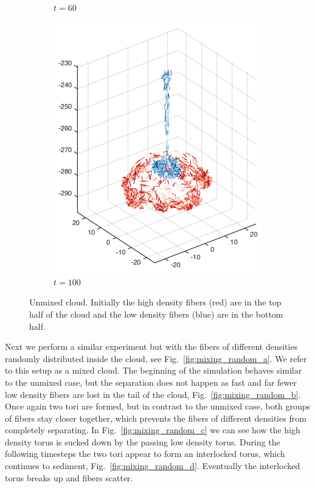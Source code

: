 \begin{figure}[!htbp]
\begin{subfigure}[h]{0.24\textwidth}
    \caption{$t=60$}\label{fig:mixing_top_c}
  \end{subfigure}
  \begin{subfigure}[h]{0.24\textwidth}
    \centering
    \includegraphics[width=\textwidth]{img/mixing/top_00100.pdf}
    \caption{$t=100$}\label{fig:mixing_top_d}
  \end{subfigure}
  \caption[Unmixed cloud.]{Unmixed cloud. Initially the high density fibers (red) are in the top half of the cloud and the low density fibers (blue) are in the bottom half.}
  \label{fig:unmixed_sphere}
\end{figure}

Next we perform a similar experiment but with the fibers of different densities randomly distributed inside the cloud, see Fig.~\ref{fig:mixing_random_a}. We refer to this setup as a mixed cloud. The beginning of the simulation behaves similar to the unmixed case, but the separation does not happen as fast and far fewer low density fibers are lost in the tail of the cloud, Fig.~\ref{fig:mixing_random_b}. Once again two tori are formed, but in contrast to the unmixed case, both groups of fibers stay closer together, which prevents the fibers of different densities from completely separating. In Fig.~\ref{fig:mixing_random_c} we can see how the high density torus is sucked down by the passing low density torus. During the following timesteps the two tori appear to form an interlocked torus, which continues to sediment, Fig.~\ref{fig:mixing_random_d}. Eventually the interlocked torus breaks up and fibers scatter. 

